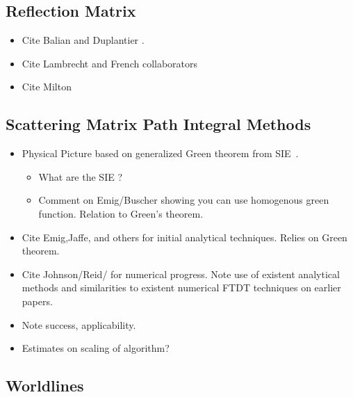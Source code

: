 \subsection{Reflection Matrix}

\begin{itemize}
\item Cite Balian and Duplantier \cite{Balian1977, Balian1978}.
\item Cite Lambrecht and French collaborators
  \cite{Lambrecht2006, MaiaNeto2008,Canaguier-Durand2012}
\item Cite Milton
\end{itemize}

\subsection{Scattering Matrix Path Integral Methods}

\begin{itemize}
\item Physical Picture based on generalized Green theorem from SIE~.
\begin{itemize}
\item What are the SIE ?  
\item Comment on Emig/Buscher showing you can use homogenous green function.  Relation to Green's theorem.
\end{itemize}

\item Cite Emig,Jaffe,  and others for initial analytical techniques.  Relies on Green theorem.
\cite{Emig2004, Emig2007, Rahi2009}
\item Cite Johnson/Reid/ for numerical progress.  Note use of existent analytical methods and similarities to existent numerical FTDT techniques on earlier papers.  \cite{Reid2009,Reid2011, Reid2013} \cite{Rodriguez2007,Rodriguez2007a, Rodriguez2009}
\item Note success, applicability.  
\item Estimates on scaling of algorithm?
\end{itemize}

\subsection{Worldlines}

